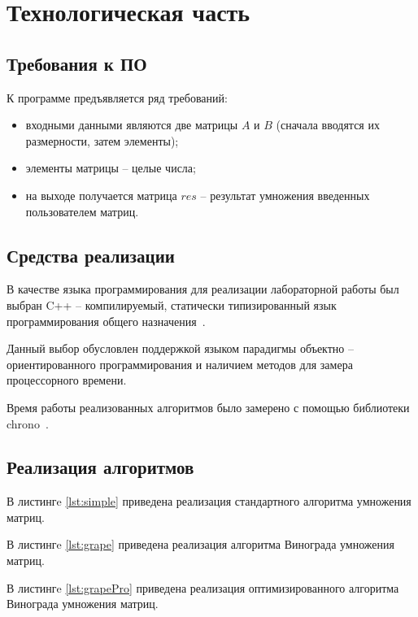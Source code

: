 \chapter{Технологическая часть}

\section{Требования к ПО}

К программе предъявляется ряд требований:
\begin{itemize}
	\item входными данными являются две матрицы $A$ и $B$ (сначала вводятся их размерности, затем элементы);
	\item элементы матрицы -- целые числа;
	\item на выходе получается матрица $res$ -- результат умножения введенных пользователем матриц.
\end{itemize}

\section{Средства реализации}

В качестве языка программирования для реализации лабораторной работы был выбран C++ -- компилируемый, статически типизированный язык программирования общего назначения~\cite{cpp}. 

Данный выбор обусловлен поддержкой языком парадигмы объектно -- ориентированного программирования и наличием методов для замера процессорного времени.

Время работы реализованных алгоритмов было замерено с помощью библиотеки chrono~\cite{chrono}.

\section{Реализация алгоритмов}

В листингe \ref{lst:simple} приведена реализация стандартного алгоритма умножения матриц.


В листингe \ref{lst:grape} приведена реализация алгоритма Винограда умножения матриц.


В листингe \ref{lst:grapePro} приведена реализация оптимизированного алгоритма Винограда умножения матриц.

